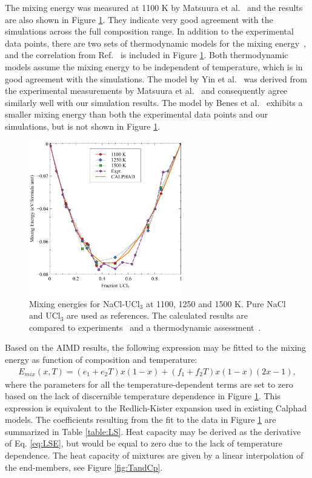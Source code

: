 \documentclass[preprint,3p,10pt,onecolumn,number,sort&compress]{elsarticle}
\begin{document}
 The mixing energy was measured at 1100 K by Matsuura et al.~\cite{Matsuura} and the results are also shown in Figure \ref{fig:mixing}. They indicate very good agreement with the simulations across the full composition range. In addition to the experimental data points, there are two sets of thermodynamic models for the mixing energy~\cite{BENES2008,YIN2020}, and the correlation from Ref.~\cite{YIN2020} is included in Figure \ref{fig:mixing}. Both thermodynamic models assume the mixing energy to be independent of temperature, which is in good agreement with the simulations. The model by Yin et al.~\cite{YIN2020} was derived from the experimental measurements by Matsuura et al.~\cite{Matsuura} and consequently agree similarly well with our simulation results. The model by Benes et al.~\cite{BENES2008} exhibits a smaller mixing energy than both the experimental data points and our simulations, but is not shown in Figure \ref{fig:mixing}. 

\begin{figure}[htb]
\centering
\includegraphics[width=0.6\textwidth]{fig9.pdf}
\caption{Mixing energies for NaCl-UCl$_3$ at 1100, 1250 and 1500 K. Pure NaCl and UCl$_3$ are used as references. The calculated results are compared to experiments~\cite{Matsuura} and a thermodynamic assessment~\cite{YIN2020}.} 
\label{fig:mixing}
\end{figure}

Based on the AIMD results, the following expression may be fitted to the mixing energy as function of composition and temperature:
\begin{equation}
\begin{split}
E_{mix}(x,T)=(e_1+e_2T)x(1-x)+(f_1+f_2T)x(1-x)(2x-1),
\label{eq:LSE}
\end{split}
\end{equation}
where the parameters for all the temperature-dependent terms are set to zero based on the lack of discernible temperature dependence in Figure \ref{fig:mixing}. This expression is equivalent to the Redlich-Kister expansion used in existing Calphad models. The coefficients resulting from the fit to the data in Figure \ref{fig:mixing} are summarized in Table \ref{table:LS}. Heat capacity may be derived as the derivative of Eq. \ref{eq:LSE}, but would be equal to zero due to the lack of temperature dependence. The heat capacity of mixtures are given by a linear interpolation of the end-members, see Figure \ref{fig:TandCp}.
\end{document}

